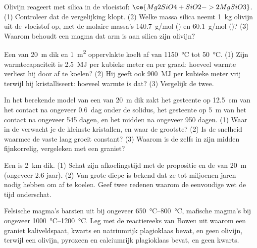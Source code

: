 \begin{exercise}[$\star\star$]\label{exo:g11:igneous-rocks:10}
Olivijn reageert met silica in de vloeistof: $\ce{Mg2SiO4 + SiO2 -> 2
MgSiO3}$. (1) Controleer dat de vergelijking klopt. (2) Welke massa silica neemt
\qty{1}{kg} olivijn uit de vloeistof op, met de molaire massa's
\qty{140.7}{g/mol} () en \qty{60.1}{g/mol} ()? (3) Waarom
behoudt een magma dat arm is aan silica zijn olivijn?
\end{exercise}

\begin{exercise}[$\star\star$]\label{exo:g11:igneous-rocks:11}
Een  van \qty{20}{m} dik en \qty{1}{m^2} oppervlakte koelt af van
\qty{1150}{\degreeCelsius} tot \qty{50}{\degreeCelsius}. (1) Zijn
warmtecapaciteit is \qty{2.5}{MJ} per kubieke meter en per graad: hoeveel warmte
verliest hij door af te koelen? (2) Hij geeft ook \qty{900}{MJ} per kubieke meter vrij terwijl hij
kristalliseert: hoeveel warmte is dat? (3) Vergelijk de twee.
\end{exercise}

\begin{exercise}[$\star\star\star$]\label{exo:g11:igneous-rocks:12}
In het berekende model van een  van \qty{20}{m} dik zakt het gesteente op
\qty{12.5}{cm} van het contact na ongeveer \num{0.6}~dag onder de solidus,
het gesteente op \qty{5}{m} van het contact na ongeveer 545 dagen,
en het midden na ongeveer 950 dagen. (1) Waar in de  verwacht je de
kleinste kristallen, en waar de grootste? (2) Is de snelheid waarmee de
vaste laag groeit constant? (3) Waarom is de  zelfs in zijn
midden fijnkorrelig, vergeleken met een graniet?
\end{exercise}

\begin{exercise}[$\star\star\star$]\label{exo:g11:igneous-rocks:13}
Een  is \qty{2}{km} dik. (1) Schat zijn afkoelingstijd met de propositie en de
 van \qty{20}{m} (ongeveer 2.6 jaar). (2) Van grote
diepe  is bekend dat ze tot miljoenen jaren nodig hebben om af te koelen. Geef twee
redenen waarom de eenvoudige wet de tijd onderschat.
\end{exercise}

\begin{exercise}[$\star\star\star$]\label{exo:g11:igneous-rocks:14}
Felsische magma's barsten uit bij ongeveer \qtyrange{650}{800}{\degreeCelsius}, mafische
magma's bij ongeveer \qtyrange{1000}{1200}{\degreeCelsius}. Leg met de
reactiereeks van Bowen uit waarom een graniet kaliveldspaat, kwarts
en natriumrijk plagioklaas bevat, en geen olivijn, terwijl een  olivijn,
pyroxeen en calciumrijk plagioklaas bevat, en geen kwarts.
\end{exercise}

